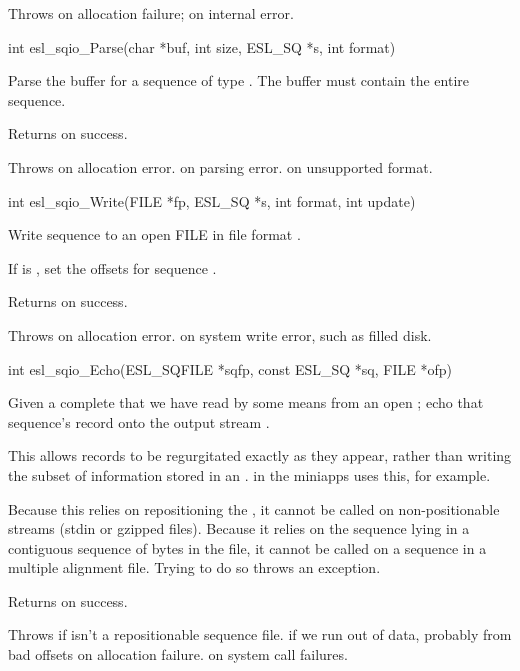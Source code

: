 \begin{sreapi}
Throws  on allocation failure;
 on internal error.


\hypertarget{func:esl_sqio_Parse()}
{\item[int esl\_sqio\_Parse(char *buf, int size, ESL\_SQ *s, int format)]}

Parse the buffer  for a sequence  of type
.  The buffer must contain the entire sequence.

Returns  on success.

Throws   on allocation error.
  on parsing error.
 on unsupported format.


\hypertarget{func:esl_sqio_Write()}
{\item[int esl\_sqio\_Write(FILE *fp, ESL\_SQ *s, int format, int update)]}

Write sequence  to an open FILE  in file format
.

If  is , set the offsets for sequence .

Returns  on success.

Throws  on allocation error.
 on system write error, such as filled disk.


\hypertarget{func:esl_sqio_Echo()}
{\item[int esl\_sqio\_Echo(ESL\_SQFILE *sqfp, const ESL\_SQ *sq, FILE *ofp)]}

Given a complete  that we have read by some means
from an open ; echo that sequence's record
onto the output stream . 

This allows records to be regurgitated exactly as they
appear, rather than writing the subset of information
stored in an .  in the miniapps uses
this, for example.

Because this relies on repositioning the , it
cannot be called on non-positionable streams (stdin or
gzipped files). Because it relies on the sequence lying
in a contiguous sequence of bytes in the file, it cannot
be called on a sequence in a multiple alignment file.
Trying to do so throws an  exception.

Returns  on success.

Throws    if  isn't a repositionable sequence file.
 if we run out of data, probably from bad offsets
     on allocation failure.
     on system call failures.





\end{sreapi}
